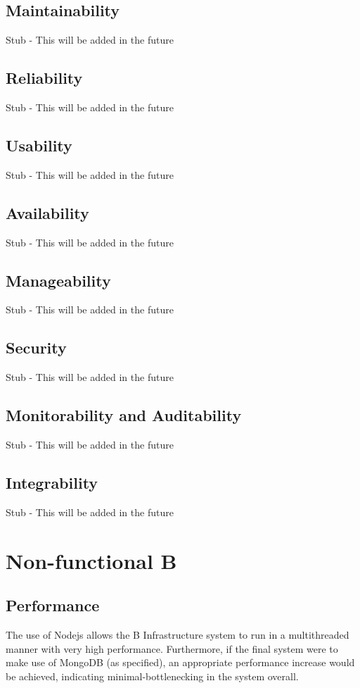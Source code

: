 \documentclass[12pt]{article}
\begin{document}
\subsection{Maintainability}
Stub - This will be added in the future
\subsection{Reliability}
Stub - This will be added in the future
\subsection{Usability}
Stub - This will be added in the future
\subsection{Availability}
Stub - This will be added in the future
\subsection{Manageability}
Stub - This will be added in the future
\subsection{Security}
Stub - This will be added in the future
\subsection{Monitorability and Auditability}
Stub - This will be added in the future
\subsection{Integrability}
Stub - This will be added in the future

\section{Non-functional B} %
\subsection{Performance}
The use of Nodejs allows the B Infrastructure system to run in a multithreaded manner with very high performance. Furthermore, if the final system were to make use of MongoDB (as specified), an appropriate performance increase would be achieved, indicating minimal-bottlenecking in the system overall.
\end{document}
